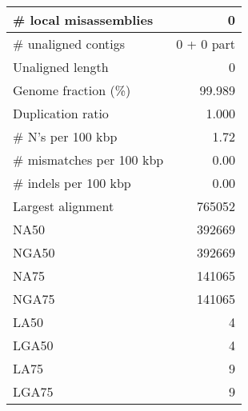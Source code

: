 \documentclass[12pt,a4paper]{article}
\begin{document}
\begin{table}[ht]
\begin{center}
\begin{tabular}{|l*{1}{|r}|}
\# local misassemblies & 0 \\ \hline
\# unaligned contigs & 0 + 0 part \\ \hline
Unaligned length & 0 \\ \hline
Genome fraction (\%) & 99.989 \\ \hline
Duplication ratio & 1.000 \\ \hline
\# N's per 100 kbp & 1.72 \\ \hline
\# mismatches per 100 kbp & 0.00 \\ \hline
\# indels per 100 kbp & 0.00 \\ \hline
Largest alignment & 765052 \\ \hline
NA50 & 392669 \\ \hline
NGA50 & 392669 \\ \hline
NA75 & 141065 \\ \hline
NGA75 & 141065 \\ \hline
LA50 & 4 \\ \hline
LGA50 & 4 \\ \hline
LA75 & 9 \\ \hline
LGA75 & 9 \\ \hline
\end{tabular}
\end{center}
\end{table}
\end{document}
